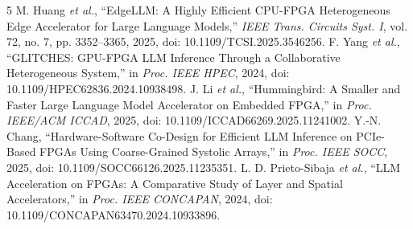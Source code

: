 \begin{thebibliography}{5}
 M. Huang \emph{et al.}, ``EdgeLLM: A Highly Efficient CPU-FPGA Heterogeneous Edge Accelerator for Large Language Models,'' \emph{IEEE Trans. Circuits Syst. I}, vol. 72, no. 7, pp. 3352--3365, 2025, doi: 10.1109/TCSI.2025.3546256.
 F. Yang \emph{et al.}, ``GLITCHES: GPU-FPGA LLM Inference Through a Collaborative Heterogeneous System,'' in \emph{Proc. IEEE HPEC}, 2024, doi: 10.1109/HPEC62836.2024.10938498.
 J. Li \emph{et al.}, ``Hummingbird: A Smaller and Faster Large Language Model Accelerator on Embedded FPGA,'' in \emph{Proc. IEEE/ACM ICCAD}, 2025, doi: 10.1109/ICCAD66269.2025.11241002.
 Y.-N. Chang, ``Hardware-Software Co-Design for Efficient LLM Inference on PCIe-Based FPGAs Using Coarse-Grained Systolic Arrays,'' in \emph{Proc. IEEE SOCC}, 2025, doi: 10.1109/SOCC66126.2025.11235351.
 L. D. Prieto-Sibaja \emph{et al.}, ``LLM Acceleration on FPGAs: A Comparative Study of Layer and Spatial Accelerators,'' in \emph{Proc. IEEE CONCAPAN}, 2024, doi: 10.1109/CONCAPAN63470.2024.10933896.
\end{thebibliography}
